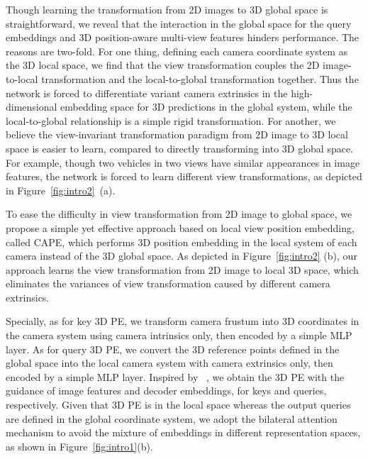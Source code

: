 \documentclass[10pt,twocolumn,letterpaper]{article}
\newcommand{\ourMethod}{CAPE}
\begin{document}
Though learning the transformation from 2D images to 3D global space is straightforward, we reveal that the interaction
in the global space for the query embeddings and 3D position-aware multi-view features hinders performance. The reasons are two-fold. For one thing, defining each camera coordinate system as the 3D local space, we find that the view transformation couples the 2D image-to-local transformation and the local-to-global transformation together. Thus the network is forced to differentiate variant camera extrinsics in the high-dimensional embedding space for 3D predictions in the global system, while the local-to-global relationship is a simple rigid transformation. For another, we believe the view-invariant transformation paradigm from 2D image to 3D local space is easier to learn, compared to directly transforming into 3D global space.
For example, though two vehicles in two views have similar appearances in image features, the network is forced to learn different view transformations, as depicted in Figure~\ref{fig:intro2}~(a).






To ease the difficulty in view transformation from 2D image to global space, we propose a simple yet effective approach based on local view position embedding, called \ourMethod{}, which performs 3D position embedding in the local system of each camera instead of the 3D global space. As depicted in Figure~\ref{fig:intro2} (b), our approach learns the view transformation from 2D image to local 3D space, which eliminates the variances of view transformation caused by different camera extrinsics. 







Specially,
as for key 3D PE, we transform camera frustum into 3D coordinates in the camera system using camera intrinsics only, then encoded by a simple MLP layer.
As for query 3D PE, we convert the 3D reference points defined in the global space into the local camera system with camera extrinsics only, then encoded by a simple MLP layer. 
Inspired by ~\cite{meng2021conditional, liu2022petrv2}, we obtain the 3D PE with the guidance of image features and decoder embeddings, for keys and queries, respectively.
Given that 3D PE is in the local space whereas the output queries are defined in the global coordinate system, 
we adopt the bilateral attention mechanism
to avoid the mixture of embeddings in different representation spaces, as shown in Figure~\ref{fig:intro1}(b).
\end{document}
